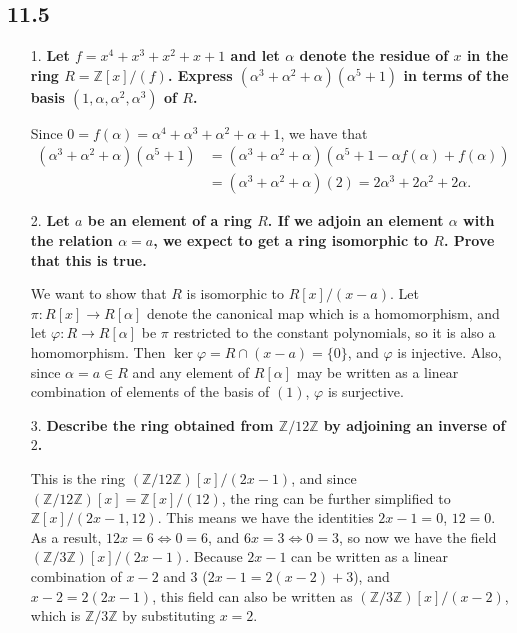 \documentclass[a4paper,12pt]{article}
\begin{document}
\subsection*{11.5}
\begin{enumerate}
    \item[1.]
        \boldmath
        \textbf{Let $f = x^4 + x^3 + x^2 + x + 1$ and let $\alpha$ denote the residue of $x$ in the ring $R = \mathbb{Z}[x]/(f)$. Express $(\alpha^3 + \alpha^2 + \alpha)(\alpha^5 + 1)$ in terms of the basis $(1, \alpha, \alpha^2, \alpha^3)$ of $R$.} \par
        \unboldmath
        Since $0 = f(\alpha) = \alpha^4 + \alpha^3 + \alpha^2 + \alpha + 1$, we have that
        \begin{align*}
            (\alpha^3 + \alpha^2 + \alpha)(\alpha^5 + 1) &= (\alpha^3 + \alpha^2 + \alpha)(\alpha^5 + 1 - \alpha f(\alpha) + f(\alpha)) \\
            &= (\alpha^3 + \alpha^2 + \alpha)(2) = 2\alpha^3 + 2\alpha^2 + 2\alpha.
        \end{align*}

    \item[2.]
        \boldmath
        \textbf{Let $a$ be an element of a ring $R$. If we adjoin an element $\alpha$ with the relation $\alpha = a$, we expect to get a ring isomorphic to $R$. Prove that this is true.} \par
        \unboldmath
        We want to show that $R$ is isomorphic to $R[x]/(x - a)$. Let $\pi : R[x] \to R[\alpha]$ denote the canonical map which is a homomorphism, and let $\varphi : R \to R[\alpha]$ be $\pi$ restricted to the constant polynomials, so it is also a homomorphism. Then $\ker \varphi = R \cap (x - a) = \{ 0 \}$, and $\varphi$ is injective. Also, since $\alpha = a \in R$ and any element of $R[\alpha]$ may be written as a linear combination of elements of the basis of $(1)$, $\varphi$ is surjective.

    \item[3.]
        \boldmath
        \textbf{Describe the ring obtained from $\mathbb{Z}/12\mathbb{Z}$ by adjoining an inverse of $2$.} \par
        \unboldmath
        This is the ring $(\mathbb{Z}/12\mathbb{Z})[x]/(2x - 1)$, and since $(\mathbb{Z}/12\mathbb{Z})[x] = \mathbb{Z}[x]/(12)$, the ring can be further simplified to $\mathbb{Z}[x]/(2x - 1, 12)$. This means we have the identities $2x - 1 = 0$, $12 = 0$. As a result, $12x = 6 \Leftrightarrow 0 = 6$, and $6x = 3 \Leftrightarrow 0 = 3$, so now we have the field $(\mathbb{Z}/3\mathbb{Z})[x] / (2x - 1)$. Because $2x - 1$ can be written as a linear combination of $x - 2$ and $3$ ($2x - 1 = 2(x - 2) + 3$), and $x - 2 = 2(2x - 1)$, this field can also be written as $(\mathbb{Z}/3\mathbb{Z})[x] / (x - 2)$, which is $\mathbb{Z}/3\mathbb{Z}$ by substituting $x = 2$.


\end{enumerate}
\end{document}
